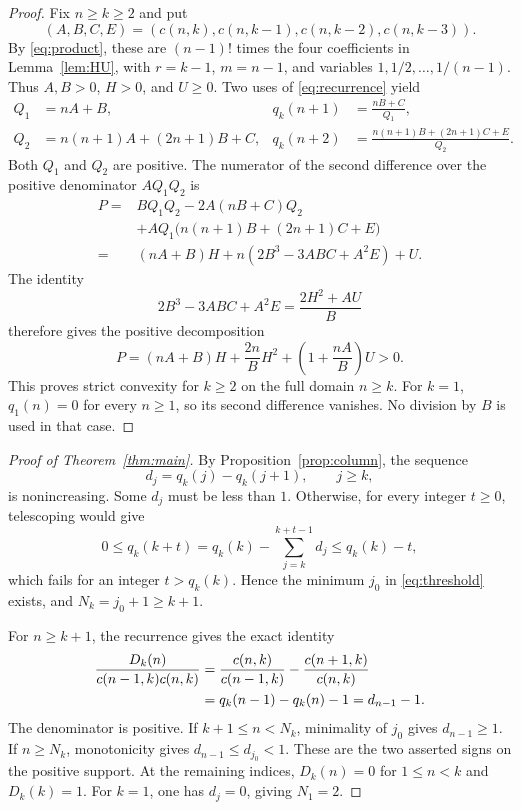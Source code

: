 \documentclass[11pt,a4paper]{article}
\theoremstyle{remark}
\newcommand{\D}{D_k}
\begin{document}
\begin{proof}
Fix $n\geq k\geq2$ and put
\[
 (A,B,C,E)=(c(n,k),c(n,k-1),c(n,k-2),c(n,k-3)).
\]
By \eqref{eq:product}, these are $(n-1)!$ times the four coefficients
in Lemma~\ref{lem:HU}, with $r=k-1$, $m=n-1$, and variables
$1,1/2,\ldots,1/(n-1)$. Thus $A,B>0$, $H>0$, and $U\geq0$.
Two uses of \eqref{eq:recurrence} yield
\begin{align*}
 Q_1&=nA+B, & q_k(n+1)&=\frac{nB+C}{Q_1},\\
 Q_2&=n(n+1)A+(2n+1)B+C,
 &q_k(n+2)&=\frac{n(n+1)B+(2n+1)C+E}{Q_2}.
\end{align*}
Both $Q_1$ and $Q_2$ are positive. The numerator of the second difference
over the positive denominator $AQ_1Q_2$ is
\begin{align*}
 P={}&BQ_1Q_2-2A(nB+C)Q_2\\
     &+AQ_1\bigl(n(n+1)B+(2n+1)C+E\bigr)\\
   ={}&(nA+B)H+n(2B^3-3ABC+A^2E)+U.
\end{align*}
The identity
\[
 2B^3-3ABC+A^2E=\frac{2H^2+AU}{B}
\]
therefore gives the positive decomposition
\begin{equation}\label{eq:positive}
 P=(nA+B)H+\frac{2n}{B}H^2+
       \left(1+\frac{nA}{B}\right)U>0.
\end{equation}
This proves strict convexity for $k\geq2$ on the full domain $n\geq k$.
For $k=1$, $q_1(n)=0$ for every $n\geq1$, so its second difference
vanishes. No division by $B$ is used in that case.
\end{proof}

\begin{proof}[Proof of Theorem~\ref{thm:main}]
By Proposition~\ref{prop:column}, the sequence
\[
 d_j=q_k(j)-q_k(j+1),\qquad j\geq k,
\]
is nonincreasing. Some $d_j$ must be less than $1$. Otherwise, for every
integer $t\geq0$, telescoping would give
\[
 0\leq q_k(k+t)=q_k(k)-\sum_{j=k}^{k+t-1}d_j
       \leq q_k(k)-t,
\]
which fails for an integer $t>q_k(k)$. Hence the minimum $j_0$ in
\eqref{eq:threshold} exists, and $N_k=j_0+1\geq k+1$.

For $n\geq k+1$, the recurrence gives the exact identity
\begin{align}
 \frac{\D(n)}{c(n-1,k)c(n,k)}
 &=\frac{c(n,k)}{c(n-1,k)}-\frac{c(n+1,k)}{c(n,k)}\notag\\
 &=q_k(n-1)-q_k(n)-1=d_{n-1}-1.\label{eq:sign}
\end{align}
The denominator is positive. If $k+1\leq n<N_k$, minimality of $j_0$
gives $d_{n-1}\geq1$. If $n\geq N_k$, monotonicity gives
$d_{n-1}\leq d_{j_0}<1$. These are the two asserted signs on the
positive support. At the remaining indices,
$\D(n)=0$ for $1\leq n<k$ and $\D(k)=1$.
For $k=1$, one has $d_j=0$, giving $N_1=2$.
\end{proof}
\end{document}
